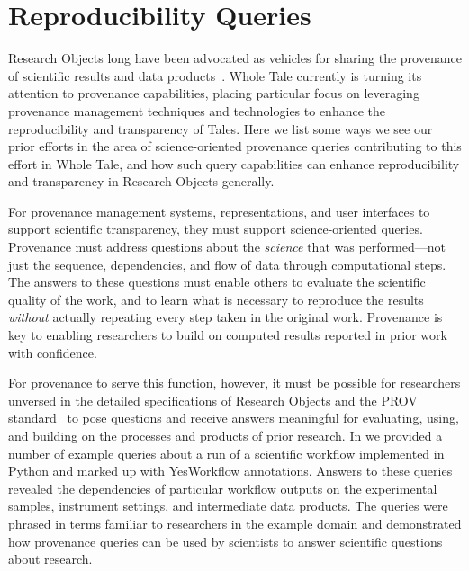 \section{Reproducibility Queries}\label{sec-transparency}

Research Objects long have been advocated as vehicles for sharing the 
	provenance of scientific results and data products~\cite{bechhofer2013whya}.
Whole Tale currently is turning its attention to provenance capabilities, placing particular
	focus on leveraging provenance management techniques and technologies
	to enhance the reproducibility and transparency of Tales.
Here we list some ways we see our prior efforts in the area
	of science-oriented provenance queries contributing to this effort in Whole Tale,
	and how such query capabilities can enhance reproducibility and transparency in 
	Research Objects generally.

For provenance management systems, representations, and user interfaces to support 
	scientific transparency, they must support science-oriented queries.
Provenance must address questions about the \emph{science} that was performed---not just the
	sequence, dependencies, and flow of data through computational steps.
The answers to these questions must enable others to evaluate the scientific quality of the work, 
	and to learn what is necessary to
	reproduce the results \emph{without} actually repeating every step taken in the original work.
Provenance is key to enabling researchers to build on computed results reported in prior work with confidence.

For provenance to serve this function, however, it must be possible for researchers unversed in the detailed
	specifications of Research Objects and the PROV standard~\cite{groth2013provoverviewa} to pose 
	questions and receive answers meaningful for evaluating, using, and building on the
	processes and products of prior research. 
In \cite{mcphillips2015retrospective} we provided a number of example queries about a run of a scientific
	workflow implemented in Python and marked up with YesWorkflow annotations.
Answers to these queries revealed the dependencies of particular workflow outputs
	on the experimental samples, instrument settings, and intermediate data products.
The queries were phrased in terms familiar to researchers  in the example domain
	and demonstrated how provenance queries can be used by scientists
	to answer scientific questions about research.

